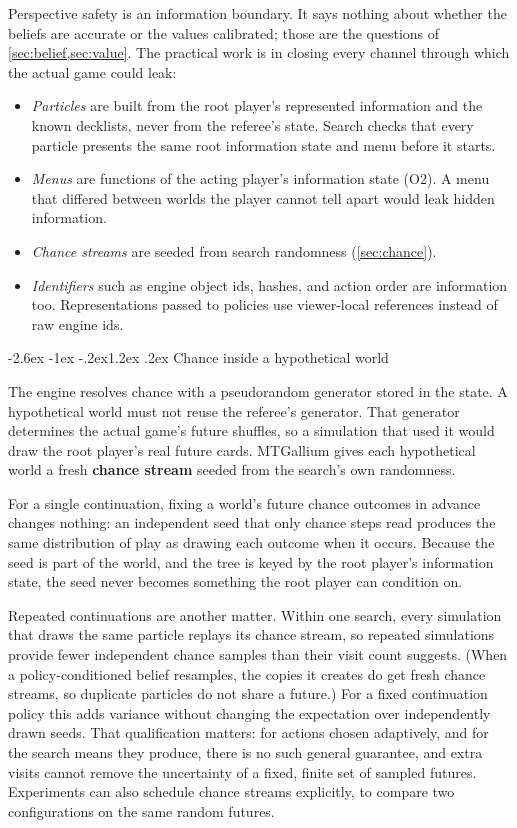 \documentclass[11pt,a4paper]{article}
\makeatletter
\renewcommand\subsection{\@startsection{subsection}{2}{\z@}
  {-2.6ex \@plus -1ex \@minus -.2ex}{1.2ex \@plus .2ex}
  {\normalfont\large\sffamily\bfseries\color{ink}}}
\theoremstyle{plain}
\theoremstyle{definition}
\newcommand{\term}[1]{\textbf{#1}}
\makeatother
\begin{document}
Perspective safety is an information boundary. It says nothing about whether
the beliefs are accurate or the values calibrated; those are the questions of
\cref{sec:belief,sec:value}. The practical work is in closing every channel
through which the actual game could leak:
\begin{itemize}
\item \emph{Particles} are built from the root player's represented
  information and the known decklists, never from the referee's state.
  Search checks that every particle presents the same root information
  state and menu before it starts.
\item \emph{Menus} are functions of the acting player's information state
  (O2). A menu that differed between worlds the player cannot
  tell apart would leak hidden information.
\item \emph{Chance streams} are seeded from search randomness
  (\cref{sec:chance}).
\item \emph{Identifiers} such as engine object ids, hashes, and action order
  are information too. Representations passed to policies use viewer-local
  references instead of raw engine ids.
\end{itemize}

\subsection{Chance inside a hypothetical world}
\label{sec:chance}

The engine resolves chance with a pseudorandom generator stored in the
state. A hypothetical world must not reuse the referee's generator. That
generator determines the actual game's future shuffles, so a simulation that
used it would draw the root player's real future cards. MTGallium gives each
hypothetical world a fresh \term{chance stream} seeded from the search's own
randomness.

For a single continuation, fixing a world's future chance outcomes in
advance changes nothing: an independent seed that only chance steps read
produces the same distribution of play as drawing each outcome when it
occurs. Because the seed is part of the world, and the tree is keyed by the
root player's information state, the seed never becomes something the root
player can condition on.

Repeated continuations are another matter. Within one search, every
simulation that draws the same particle replays its chance stream, so
repeated simulations provide fewer independent chance samples than their
visit count suggests. (When a policy-conditioned belief resamples, the copies
it creates do get fresh chance streams, so duplicate particles do not share a
future.) For a fixed continuation policy this
adds variance without changing the expectation over independently drawn
seeds. That qualification matters: for actions chosen adaptively, and for the
search means they produce, there is no such general guarantee, and extra
visits cannot remove the uncertainty of a fixed, finite set of sampled
futures. Experiments
can also schedule chance streams explicitly, to compare two configurations on
the same random futures.
\end{document}
